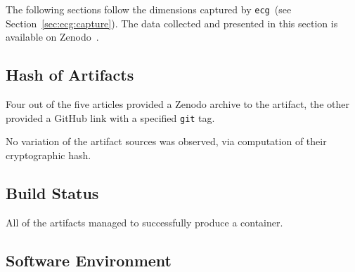 \documentclass[sigconf,natbib=false]{acmart}
\newcommand{\df}{\texttt{Dockerfile}}
\newcommand{\ecg}{\texttt{ecg}}
\begin{document}
The following sections follow the dimensions captured by \ecg\ (see Section~\ref{sec:ecg:capture}).
The data collected and presented in this section is available on Zenodo~\cite{dataset_europar24}.

\subsection{Hash of Artifacts}

Four out of the five articles provided a Zenodo archive to the artifact, the other provided a GitHub link with a specified \texttt{git} tag.

No variation of the artifact sources was observed, via computation of their cryptographic hash.

\subsection{Build Status}

All of the artifacts managed to successfully produce a container.

\subsection{Software Environment}

\begin{table}
  \centering
  \caption{Information about the \df s from the study.}\label{tab:info}
\end{table}
\end{document}
